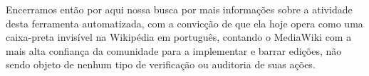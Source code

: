 Encerramos então por aqui nossa busca por mais informações sobre a atividade desta ferramenta automatizada, com a convicção de que ela hoje opera como uma caixa-preta invisível na Wikipédia em português, contando o MediaWiki com a mais alta confiança da comunidade para a implementar e barrar edições, não sendo objeto de nenhum tipo de verificação ou auditoria de suas ações.
